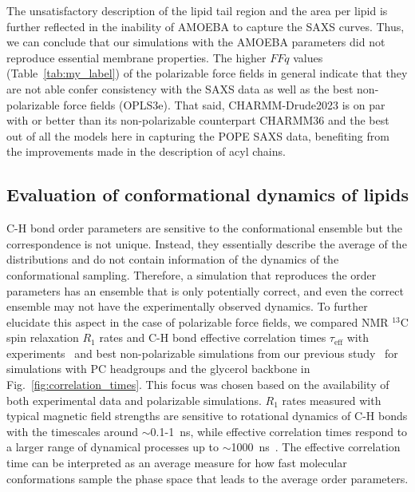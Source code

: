 \documentclass[journal=jacsat,manuscript=article,layout=singlecolumn]{achemso}
\begin{document}
The unsatisfactory description of the lipid tail region and the area per lipid is further reflected in the inability of AMOEBA to capture the SAXS curves. Thus, we can conclude that our simulations with the AMOEBA parameters did not reproduce essential
membrane properties. The higher $FFq$ values (Table~\ref{tab:my_label}) of the polarizable force fields in general indicate that they are not able confer consistency with the SAXS data as well as the best non-polarizable force fields (OPLS3e). That said, CHARMM-Drude2023 is on par with or better than its non-polarizable counterpart CHARMM36 and the best out of all the models here in capturing the POPE SAXS data, benefiting from the improvements made in the description of acyl chains.




\subsection{Evaluation of conformational dynamics of lipids}
C-H bond order parameters are sensitive to the conformational ensemble but the correspondence is not unique. Instead, they essentially describe the average of the distributions and do not contain information of the dynamics of the conformational sampling. Therefore, a simulation that reproduces the order parameters has an ensemble that is only potentially correct, and even the correct ensemble may not have the experimentally observed dynamics. To further elucidate this aspect in the case of polarizable force fields, we compared NMR $^{13}$C spin relaxation $R_{1}$ rates and C-H bond effective correlation times $\tau_{\mathrm{eff}}$ with experiments~\cite{ferreira15} and best non-polarizable simulations from our previous study~\cite{Antila2021} for simulations with PC headgroups and the glycerol backbone in Fig.~\ref{fig:correlation_times}. This focus was chosen based on the availability of both experimental data and polarizable simulations. $R_{1}$ rates measured with typical magnetic field strengths are sensitive to rotational dynamics of C-H bonds with the timescales around $\sim$0.1-1~ns, while effective correlation times respond to a larger range of dynamical processes up to $\sim$1000~ns~\cite{ferreira15}. The effective correlation time can be interpreted as an average measure for how fast molecular conformations sample the phase space that leads to the average order parameters.
\end{document}
